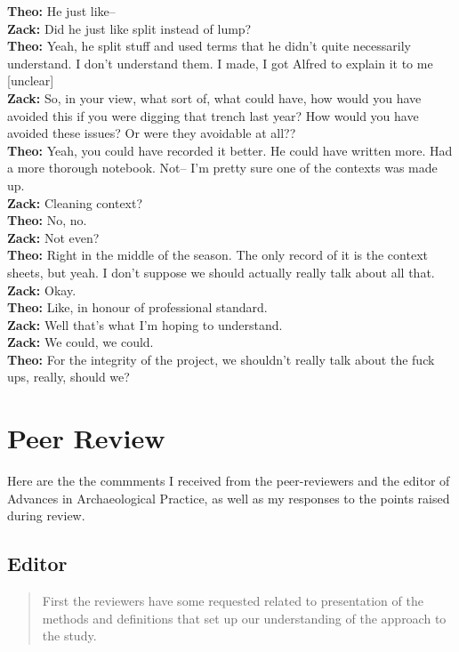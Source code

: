 \documentclass[
]{article}
\begin{document}
\textbf{Theo:} He just like--\\
\textbf{Zack:} Did he just like split instead of lump?\\
\textbf{Theo:} Yeah, he split stuff and used terms that he didn't quite
necessarily understand. I don't understand them. I made, I got Alfred to
explain it to me {[}unclear{]}\\
\textbf{Zack:} So, in your view, what sort of, what could have, how
would you have avoided this if you were digging that trench last year?
How would you have avoided these issues? Or were they avoidable at
all??\\
\textbf{Theo:} Yeah, you could have recorded it better. He could have
written more. Had a more thorough notebook. Not-- I'm pretty sure one of
the contexts was made up.\\
\textbf{Zack:} Cleaning context?\\
\textbf{Theo:} No, no.\\
\textbf{Zack:} Not even?\\
\textbf{Theo:} Right in the middle of the season. The only record of it
is the context sheets, but yeah. I don't suppose we should actually
really talk about all that.\\
\textbf{Zack:} Okay.\\
\textbf{Theo:} Like, in honour of professional standard.\\
\textbf{Zack:} Well that's what I'm hoping to understand.\\
\textbf{Zack:} We could, we could.\\
\textbf{Theo:} For the integrity of the project, we shouldn't really
talk about the fuck ups, really, should we?

\section{Peer Review}\label{peer-review}

Here are the the commments I received from the peer-reviewers and the
editor of Advances in Archaeological Practice, as well as my responses
to the points raised during review.

\subsection{Editor}\label{editor}

\begin{quote}
First the reviewers have some requested related to presentation of the
methods and definitions that set up our understanding of the approach to
the study.
\end{quote}
\end{document}
